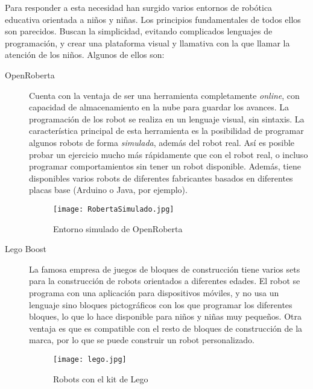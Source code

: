 Para responder a esta necesidad han surgido varios entornos de robótica educativa orientada a niños y niñas. Los principios fundamentales de todos ellos son parecidos. Buscan la simplicidad, evitando complicados lenguajes de programación, y crear una plataforma visual y llamativa con la que llamar la atención de los niños. Algunos de ellos son:
\begin{description}
	\item [OpenRoberta]\cite{Roberta} Cuenta con la ventaja de ser una herramienta completamente \textit{online}, con capacidad de almacenamiento en la nube para guardar los avances. La programación de los robot se realiza en un lenguaje visual, sin sintaxis. La característica principal de esta herramienta es la posibilidad de programar algunos robots de forma \textit{simulada}, además del robot real. Así es posible probar un ejercicio mucho más rápidamente que con el robot real, o incluso programar comportamientos sin tener un robot disponible. Además, tiene disponibles varios robots de diferentes fabricantes basados en diferentes placas base (Arduino o Java, por ejemplo). 	
	\begin{figure}[h]
		\centering
		\texttt{[image: RobertaSimulado.jpg]}
		\caption{Entorno simulado de OpenRoberta}
		\label{img:roberta}
	\end{figure}
	
	\item [Lego Boost]\cite{Lego} La famosa empresa de juegos de bloques de construcción tiene varios sets para la construcción de robots orientados a diferentes edades. El robot se programa con una aplicación para dispositivos móviles, y no usa un lenguaje sino bloques pictográficos con los que programar los diferentes bloques, lo que lo hace disponible para niños y niñas muy pequeños. Otra ventaja es que es compatible con el resto de bloques de construcción de la marca, por lo que se puede construir un robot personalizado.
	\begin{figure}[h]
		\centering
		\texttt{[image: lego.jpg]}
		\caption{Robots con el kit de Lego}
		\label{img:lego}
	\end{figure}
	

\end{description}
